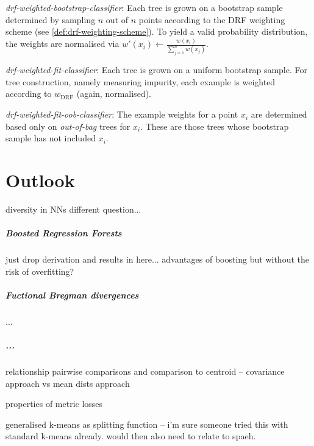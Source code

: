 \documentclass[
    a4paper, %
	fontsize=10pt, %
	twoside=false, %
]{kaobook}
\begin{document}
\textit{drf-weighted-bootstrap-classifier}: Each tree is grown on a bootstrap sample determined by sampling $n$ out of $n$ points according to the DRF weighting scheme (see \ref{def:drf-weighting-scheme}). To yield a valid probability distribution, the weights are normalised via $w'(x_i) \gets \frac{w(x_i)}{\sum_{j=1}^n w(x_j)}$.

\textit{drf-weighted-fit-classifier}: Each tree is grown on a uniform bootstrap sample. For tree construction, namely measuring impurity, each example is weighted according to $w_{\text{DRF}}$ (again, normalised).

\textit{drf-weighted-fit-oob-classifier}: The example weights for a point $x_i$ are determined based only on \textit{out-of-bag} trees for $x_i$. These are those trees whose bootstrap sample has not included $x_i$.

\chapter{Outlook}

diversity in NNs different question...

\paragraph{Boosted Regression Forests}
just drop derivation and results in here...
advantages of boosting but without the risk of overfitting?


\paragraph{Fuctional Bregman divergences} ...

\paragraph{...}

relationship pairwise comparisons and comparison to centroid -- covariance approach vs mean dists approach

properties of metric losses

generalised k-means as splitting function -- i'm sure someone tried this with standard k-means already. would then also need to relate to spaeh.
\end{document}
